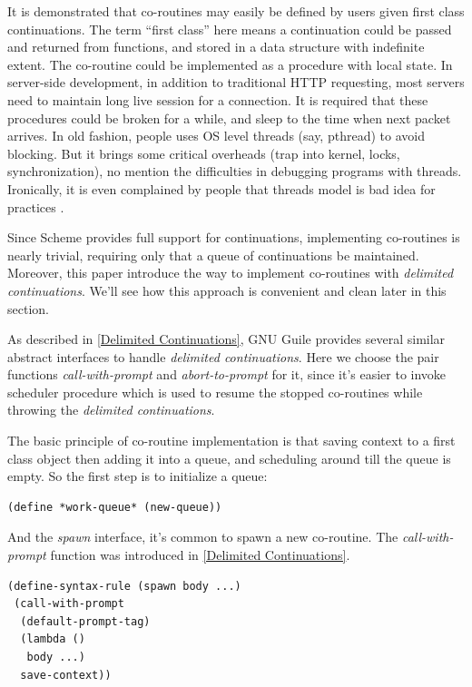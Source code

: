 \documentclass[numbers,numberedpars]{sigplanconf}
\begin{document}
It is demonstrated that co-routines may easily be defined by users given first class continuations\citep{Haynes:1984:CC:800055.802046}. The
term ``first class'' here means a continuation could be passed and returned from functions, and stored in a data structure with indefinite
extent. The co-routine could be implemented as a procedure with local state. In server-side development, in addition to traditional HTTP
requesting,
most servers need to maintain long live session for a connection. It is required that these procedures could be broken for a while, and sleep
to the time when next packet arrives. In old fashion, people uses OS level threads (say, pthread) to avoid blocking. But it brings some
critical overheads (trap into kernel, locks, synchronization), no mention the difficulties in debugging programs with threads. Ironically,
it is even complained by people that threads model is bad idea for practices \citep{ousterhout1996threads}.

Since Scheme provides full support for continuations, implementing co-routines is nearly trivial, requiring only that a queue of continuations
be maintained. Moreover, this paper introduce the way to implement co-routines with {\it delimited continuations}. We'll see how this approach is
convenient and clean later in this section.

As described in \ref{Delimited Continuations}, GNU Guile provides several similar abstract interfaces to handle {\it delimited continuations}.
Here we choose the pair functions {\it call-with-prompt} and {\it abort-to-prompt} for it, since it's easier to invoke scheduler procedure
which is used to resume the stopped co-routines while throwing the {\it delimited continuations}.

The basic principle of co-routine implementation is that saving context to a first class object then adding it into a queue, and scheduling
around till the queue is empty. So the first step is to initialize a queue:

\begin{lstlisting}
(define *work-queue* (new-queue))
\end{lstlisting}

And the {\it spawn} interface, it's common to spawn a new co-routine. The {\it call-with-prompt} function was introduced in
\ref{Delimited Continuations}.

\begin{lstlisting}
(define-syntax-rule (spawn body ...)
 (call-with-prompt
  (default-prompt-tag)
  (lambda ()
   body ...)
  save-context))
\end{lstlisting}
\end{document}
